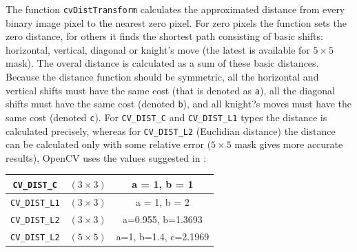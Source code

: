 \begin{description}
\end{description}

The function \texttt{cvDistTransform} calculates the approximated
distance from every binary image pixel to the nearest zero pixel.
For zero pixels the function sets the zero distance, for others it
finds the shortest path consisting of basic shifts: horizontal,
vertical, diagonal or knight's move (the latest is available for
$5\times 5$ mask). The overal distance is calculated as a sum of these
basic distances. Because the distance function should be symmetric,
all the horizontal and vertical shifts must have the same cost (that
is denoted as \texttt{a}), all the diagonal shifts must have the
same cost (denoted \texttt{b}), and all knight?s moves must have
the same cost (denoted \texttt{c}). For \texttt{CV\_DIST\_C} and
\texttt{CV\_DIST\_L1} types the distance is calculated precisely,
whereas for \texttt{CV\_DIST\_L2} (Euclidian distance) the distance
can be calculated only with some relative error ($5\times 5$ mask
gives more accurate results), OpenCV uses the values suggested in
\cite{Borgefors86}:


\begin{tabular}{| c | c | c |}
\hline
\texttt{CV\_DIST\_C}  & $(3\times 3)$ & a = 1, b = 1\\ \hline
\texttt{CV\_DIST\_L1} & $(3\times 3)$ & a = 1, b = 2\\ \hline
\texttt{CV\_DIST\_L2} & $(3\times 3)$ & a=0.955, b=1.3693\\ \hline
\texttt{CV\_DIST\_L2} & $(5\times 5)$ & a=1, b=1.4, c=2.1969\\ \hline
\end{tabular}

